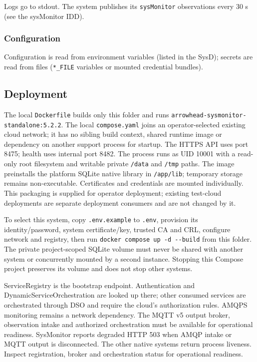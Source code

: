 \documentclass[a4paper]{arrowhead}
\begin{document}
Logs go to stdout. The system publishes its \texttt{sysMonitor} observations every 30 s (see the sysMonitor IDD).

\subsubsection{Configuration}

Configuration is read from environment variables (listed in the SysD); secrets are read from files (\texttt{*\_\allowbreak{}FILE} variables or mounted credential bundles).

\subsection{Deployment}

The local \texttt{Dockerfile} builds only this folder and runs \texttt{arrowhead-\allowbreak{}sysmonitor-\allowbreak{}standalone:5.2.2}. The local \texttt{compose.yaml} joins an operator-selected existing cloud network; it has no sibling build context, shared runtime image or dependency on another support process for startup. The HTTPS API uses port 8475; health uses internal port 8482. The process runs as UID 10001 with a read-only root filesystem and writable private \texttt{/\allowbreak{}data} and \texttt{/\allowbreak{}tmp} paths. The image preinstalls the platform SQLite native library in \texttt{/app/lib}; temporary storage remains non-executable. Certificates and credentials are mounted individually. This packaging is supplied for operator deployment; existing test-cloud deployments are separate deployment consumers and are not changed by it.

To select this system, copy \texttt{.env.example} to \texttt{.env}, provision its identity/password, system certificate/key, trusted CA and CRL, configure network and registry, then run \texttt{docker compose up -\allowbreak{}d -\allowbreak{}-\allowbreak{}build} from this folder. The private project-scoped SQLite volume must never be shared with another system or concurrently mounted by a second instance. Stopping this Compose project preserves its volume and does not stop other systems.

ServiceRegistry is the bootstrap endpoint. Authentication and DynamicServiceOrchestration are looked up there; other consumed services are orchestrated through DSO and require the cloud's authorization rules. AMQPS monitoring remains a network dependency. The MQTT v5 output broker, observation intake and authorized orchestration must be available for operational readiness. SysMonitor reports degraded HTTP 503 when AMQP intake or MQTT output is disconnected. The other native systems return process liveness. Inspect registration, broker and orchestration status for operational readiness.
\end{document}
